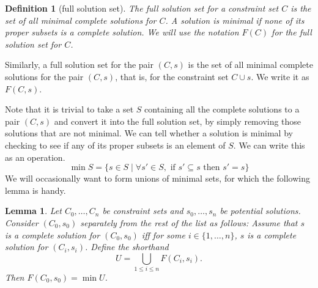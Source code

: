 \documentclass{article}
\newtheorem{lem}{Lemma}
\newtheorem{dfn}{Definition}
\begin{document}
\begin{dfn}[full solution set]\label{D:F}
The \emph{full solution set} for a constraint set $C$ is the set of all minimal complete solutions for $C$.  A solution is minimal if none of its proper subsets is a complete solution.  We will use the notation $F(C)$ for the full solution set for $C$.
\end{dfn}

Similarly, a full solution set for the pair $(C,s)$ is the set of all minimal complete solutions for the pair $(C,s)$, that is, for the constraint set $C\cup s$.  We write it as $F(C,s)$.

Note that it is trivial to take a set $S$ containing all the complete solutions to a pair $(C,s)$ and convert it into the full solution set, by simply removing those solutions that are not minimal.  We can tell whether a solution is minimal by checking to see if any of its proper subsets is an element of $S$.  We can write this as an operation.
	$$	\min S = \{ s\in S \mid \forall s'\in S, \text{ if }s'\subseteq s\text{ then } s'=s \}	$$
We will occasionally want to form unions of minimal sets, for which the following lemma is handy.

\begin{lem}\label{L:U}
Let $C_0,\ldots,C_n$ be constraint sets and $s_0,\ldots,s_n$ be potential solutions.  Consider $(C_0,s_0)$ separately from the rest of the list as follows:  Assume that $s$ is a complete solution for $(C_0,s_0)$ iff for some $i\in\{1,\ldots,n\}$, $s$ is a complete solution for $(C_i,s_i)$.  Define the shorthand
	$$	U = \bigcup_{1\leq i\leq n}F(C_i,s_i).	$$
Then $F(C_0,s_0) = \min U$.
\end{lem}
\end{document}
